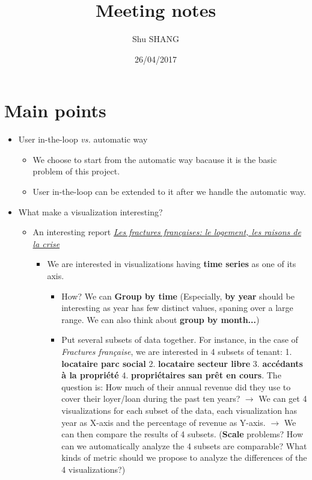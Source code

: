 \documentclass{article}
\title{Meeting notes}
\author{Shu SHANG}
\date{26/04/2017}
\begin{document}
\maketitle

\section{Main points}
\begin{itemize}
	\item User in-the-loop {\em vs.} automatic way
	\begin{itemize}
		\item We choose to start from the automatic way bacause it is the basic problem of this project.
		\item User in-the-loop can be extended to it after we handle the automatic way.
	\end{itemize}
	\item What make a visualization interesting? 
	\begin{itemize}
		\item An interesting report {\em \href{http://www.lemonde.fr/les-decodeurs/portfolio/2017/04/18/les-fractures-francaises-1-5-le-logement-les-raisons-de-la-crise_5112859_4355770.html}{Les fractures françaises: le logement, les raisons de la crise}}
		\begin{itemize}
			\item We are interested in visualizations having {\bf time series} as one of its axis.
			\begin{itemize}
				\item How? We can {\bf Group by time } (Especially, {\bf by year} should be interesting as year has few distinct values, spaning over a large range. We can also think about {\bf group by month...})
				\item Put several subsets of data together. For instance, in the case of {\em Fractures française}, we are interested in 4 subsets of tenant: 1. {\bf locataire parc social} 2. {\bf locataire secteur libre} 3. {\bf accédants à la propriété} 4. {\bf propriétaires san prêt en cours}. The question is: How much of their annual revenue did they use to cover their loyer/loan during the past ten years? $\rightarrow$ We can get 4 visualizations for each subset of the data, each visualization has year as X-axis and the percentage of revenue as Y-axis. $\rightarrow$ We can then compare the results of 4 subsets. ({\bf Scale} problems? How can we automatically analyze the 4 subsets are comparable? What kinds of metric should we propose to analyze the differences of the 4 visualizations?)

\end{itemize}
\end{itemize}
\end{itemize}
\end{itemize}
\end{document}
